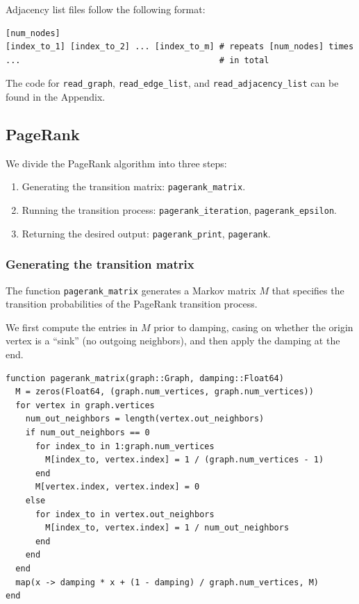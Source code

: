 \documentclass[12pt, titlepage, twoside]{amsart}
\begin{document}
Adjacency list files follow the following format:

\begin{verbatim}
[num_nodes]
[index_to_1] [index_to_2] ... [index_to_m] # repeats [num_nodes] times
...                                        # in total
\end{verbatim}

The code for
\texttt{read_graph},
\texttt{read_edge_list}, and \texttt{read_adjacency_list} can be found in the
Appendix.

\subsection{PageRank}

We divide the PageRank algorithm into three steps:

\begin{enumerate}
  \item Generating the transition matrix: \texttt{pagerank_matrix}.
  \item Running the transition process: \texttt{pagerank_iteration}, \texttt{pagerank_epsilon}.
  \item Returning the desired output: \texttt{pagerank_print}, \texttt{pagerank}.
\end{enumerate}

\subsubsection{Generating the transition matrix}

The function \texttt{pagerank_matrix} generates a Markov matrix $M$ that specifies the transition
probabilities of the PageRank transition process.

We first compute the entries in $M$ prior to damping, casing on whether the origin vertex is a ``sink''
(no outgoing neighbors), and then apply the damping at the end.

\begin{verbatim}
function pagerank_matrix(graph::Graph, damping::Float64)
  M = zeros(Float64, (graph.num_vertices, graph.num_vertices))
  for vertex in graph.vertices
    num_out_neighbors = length(vertex.out_neighbors)
    if num_out_neighbors == 0
      for index_to in 1:graph.num_vertices
        M[index_to, vertex.index] = 1 / (graph.num_vertices - 1)
      end
      M[vertex.index, vertex.index] = 0
    else
      for index_to in vertex.out_neighbors
        M[index_to, vertex.index] = 1 / num_out_neighbors
      end
    end
  end
  map(x -> damping * x + (1 - damping) / graph.num_vertices, M)
end
\end{verbatim}
\end{document}
